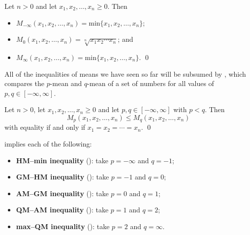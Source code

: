 \begin{proposition}
\label{propZeroAndInfinityMeans}
Let $n > 0$ and let $x_1,x_2,\dots,x_n \ge 0$. Then
\begin{itemize}
\item $M_{-\infty}(x_1,x_2,\dots,x_n) = \mathrm{min}\{ x_1,x_2,\dots,x_n \}$;
\item $M_0(x_1,x_2,\dots,x_n) = \sqrt[n]{x_1x_2\cdots x_n}$; and
\item $M_{\infty}(x_1,x_2,\dots,x_n) = \mathrm{min}\{ x_1,x_2,\dots,x_n \}$. \qed
\end{itemize}
\end{proposition}

All of the inequalities of means we have seen so far will be subsumed by , which compares the $p$-mean and $q$-mean of a set of numbers for all values of $p,q \in [-\infty,\infty]$.

\begin{theorem}
\label{thmGeneralisedMeanInequality}
Let $n > 0$, let $x_1,x_2,\dots,x_n \ge 0$ and let $p,q \in [-\infty,\infty]$ with $p<q$. Then
\[ M_p(x_1,x_2,\dots,x_n) \le M_q(x_1,x_2,\dots,x_n) \]
with equality if and only if $x_1=x_2=\cdots=x_n$. \qed
\end{theorem}

 implies each of the following:
\begin{itemize}
\item \textbf{HM--min inequality} (): take $p=-\infty$ and $q=-1$;
\item \textbf{GM--HM inequality} (): take $p=-1$ and $q=0$;
\item \textbf{AM--GM inequality} (): take $p=0$ and $q=1$;
\item \textbf{QM--AM inequality} (): take $p=1$ and $q=2$;
\item \textbf{max--QM inequality} (): take $p=2$ and $q=\infty$.
\end{itemize}